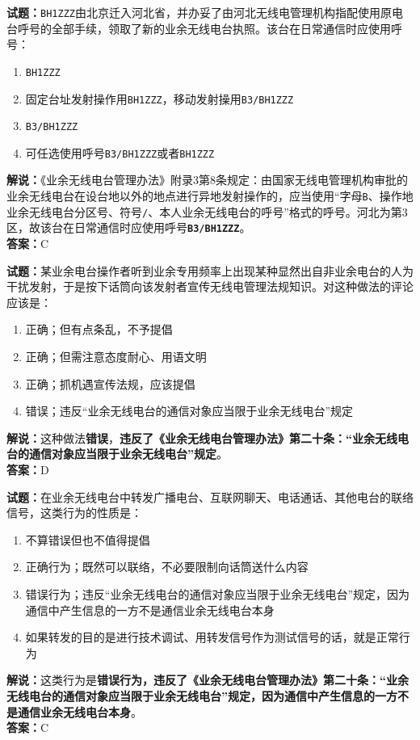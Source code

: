 \documentclass{ctexbook}
\begin{document}
\vspace{\baselineskip}

\noindent\textbf{试题：}\texttt{BH1ZZZ}由北京迁入河北省，并办妥了由河北无线电管理机构指配使用原电台呼号的全部手续，领取了新的业余无线电台执照。该台在日常通信时应使用呼号：
\begin{enumerate}[leftmargin=3em]
  \item \texttt{BH1ZZZ}
  \item 固定台址发射操作用\texttt{BH1ZZZ}，移动发射操用\texttt{B3/BH1ZZZ}
  \item \texttt{B3/BH1ZZZ}
  \item 可任选使用呼号\texttt{B3/BH1ZZZ}或者\texttt{BH1ZZZ}
\end{enumerate}
\noindent\textbf{解说：}《业余无线电台管理办法》附录3第8条规定：由国家无线电管理机构审批的业余无线电台在设台地以外的地点进行异地发射操作的，应当使用“字母\texttt{B}、操作地业余无线电台分区号、符号\texttt{/}、本人业余无线电台的呼号”格式的呼号。河北为第3区，故该台在日常通信时应使用呼号\texttt{\textbf{B3/BH1ZZZ}}。\\\noindent\textbf{答案：}C

\vspace{\baselineskip}

\noindent\textbf{试题：}某业余电台操作者听到业余专用频率上出现某种显然出自非业余电台的人为干扰发射，于是按下话筒向该发射者宣传无线电管理法规知识。对这种做法的评论应该是：
\begin{enumerate}[leftmargin=3em]
  \item 正确；但有点条乱，不予提倡
  \item 正确；但需注意态度耐心、用语文明
  \item 正确；抓机遇宣传法规，应该提倡
  \item 错误；违反“业余无线电台的通信对象应当限于业余无线电台”规定
\end{enumerate}
\noindent\textbf{解说：}这种做法\textbf{错误}，\textbf{违反了《业余无线电台管理办法》第二十条：“业余无线电台的通信对象应当限于业余无线电台”规定}。\\\noindent\textbf{答案：}D

\vspace{\baselineskip}

\noindent\textbf{试题：}在业余无线电台中转发广播电台、互联网聊天、电话通话、其他电台的联络信号，这类行为的性质是：
\begin{enumerate}[leftmargin=3em]
  \item 不算错误但也不值得提倡
  \item 正确行为；既然可以联络，不必要限制向话筒送什么内容
  \item 错误行为；违反“业余无线电台的通信对象应当限于业余无线电台”规定，因为通信中产生信息的一方不是通信业余无线电台本身
  \item 如果转发的目的是进行技术调试、用转发信号作为测试信号的话，就是正常行为
\end{enumerate}
\noindent\textbf{解说：}这类行为是\textbf{错误行为，违反了《业余无线电台管理办法》第二十条：“业余无线电台的通信对象应当限于业余无线电台”规定，因为通信中产生信息的一方不是通信业余无线电台本身}。\\\noindent\textbf{答案：}C
\end{document}
